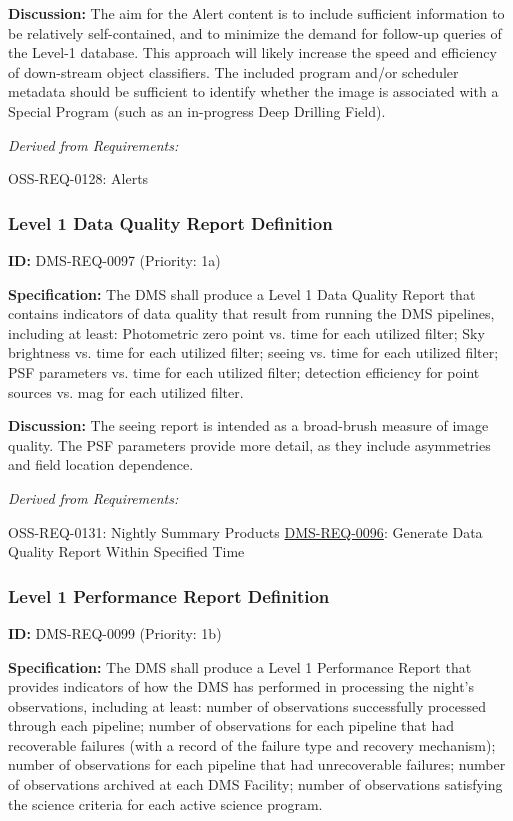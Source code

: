 \documentclass[SE,toc,lsstdraft]{lsstdoc}
\begin{document}
\textbf{Discussion:}
    The aim for the Alert content is to include sufficient information to be relatively self-contained, and to minimize the demand for follow-up queries of the Level-1 database. This approach will likely increase the speed and efficiency of down-stream object classifiers. The included program and/or scheduler metadata should be sufficient to identify whether the image is associated with a Special Program (such as an in-progress Deep Drilling Field).

\emph{Derived from Requirements:}

OSS-REQ-0128:
Alerts \newline

\subsubsection{Level 1 Data Quality Report Definition}

\label{DMS-REQ-0097}
\textbf{ID:} DMS-REQ-0097 (Priority: 1a)

\textbf{Specification:} The DMS shall produce a Level 1 Data Quality Report that contains indicators of data quality that result from running the DMS pipelines, including at least: Photometric zero point vs. time for each utilized filter; Sky brightness vs. time for each utilized filter; seeing vs. time for each utilized filter; PSF parameters vs. time for each utilized filter; detection efficiency for point sources vs. mag for each utilized filter.

\textbf{Discussion:} The seeing report is intended as a broad-brush measure of image quality.  The PSF parameters provide more detail, as they include asymmetries and field location dependence.

\emph{Derived from Requirements:}

OSS-REQ-0131:
Nightly Summary Products \newline
\hyperref[DMS-REQ-0096]{DMS-REQ-0096}:
Generate Data Quality Report Within Specified Time \newline

\subsubsection{Level 1 Performance Report Definition}

\label{DMS-REQ-0099}
\textbf{ID:} DMS-REQ-0099 (Priority: 1b)

\textbf{Specification:} The DMS shall produce a Level 1 Performance Report that provides indicators of how the DMS has performed in processing the night's observations, including at least: number of observations successfully processed through each pipeline; number of observations for each pipeline that had recoverable failures (with a record of the failure type and recovery mechanism); number of observations for each pipeline that had unrecoverable failures; number of observations archived at each DMS Facility; number of observations satisfying the science criteria for each active science program.
\end{document}
